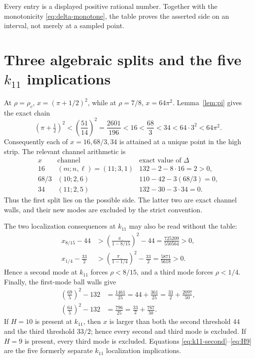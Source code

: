 \documentclass[11pt]{article}
\newcommand{\Dlt}{\Delta}
\newcommand{\pimin}{\pi_-}
\begin{document}
Every entry is a displayed positive rational number.  Together with the
monotonicity \eqref{eq:delta-monotone}, the table proves the asserted side
on an interval, not merely at a sampled point.

\section{Three algebraic splits and the five \(k_{11}\) implications}

At \(\rho=\rho_c\), \(x=(\pi+1/2)^2\), while at \(\rho=7/8\),
\(x=64\pi^2\).  Lemma~\ref{lem:pi} gives the exact chain
\begin{equation}
 (\pi+\tfrac12)^2
 <\left(\frac{51}{14}\right)^2
 =\frac{2601}{196}<16<\frac{68}{3}<34<64\cdot3^2<64\pi^2.
 \label{eq:split-strip}
\end{equation}
Consequently each of \(x=16,68/3,34\) is attained at a unique point in
the high strip.  The relevant channel arithmetic is
\begin{equation}
\begin{array}{c|c|c}
x&\text{channel}&\text{exact value of }\Dlt\\ \hline
16&(m;n,\ell)=(11;3,1)&132-2-8\cdot16=2>0,\\
68/3&(10;2,6)&110-42-3(68/3)=0,\\
34&(11;2,5)&132-30-3\cdot34=0.
\end{array}
\label{eq:algebraic-splits}
\end{equation}
Thus the first split lies on the possible side.  The latter two are exact
channel walls, and their new modes are excluded by the strict convention.

The two localization consequences at \(k_{11}\) may also be read without
the table:
\begin{align}
 x_{8/15}-44
 &>\left(\frac{\pimin}{1-8/15}\right)^2-44
 =\frac{725209}{550564}>0,\label{eq:k11-second}\\
 x_{1/4}-\frac{33}{2}
 &>\left(\frac{\pimin}{1-1/4}\right)^2-\frac{33}{2}
 =\frac{5871}{5618}>0.\label{eq:k11-third}
\end{align}
Hence a second mode at \(k_{11}\) forces \(\rho<8/15\), and a third mode
forces \(\rho<1/4\).  Finally, the first-mode ball walls give
\begin{align}
 \left(\frac{69}{5}\right)^2-132
 &=\frac{1461}{25}
 =44+\frac{361}{25}
 =\frac{33}{2}+\frac{2097}{50},\label{eq:H10}\\
 \left(\frac{64}{5}\right)^2-132
 &=\frac{796}{25}
 =\frac{33}{2}+\frac{767}{50}.\label{eq:H9}
\end{align}
If \(H=10\) is present at \(k_{11}\), then \(x\) is larger than both the
second threshold \(44\) and the third threshold \(33/2\); hence every
second and third mode is excluded.  If \(H=9\) is present, every third
mode is excluded.  Equations \eqref{eq:k11-second}--\eqref{eq:H9} are the
five formerly separate \(k_{11}\) localization implications.
\end{document}
